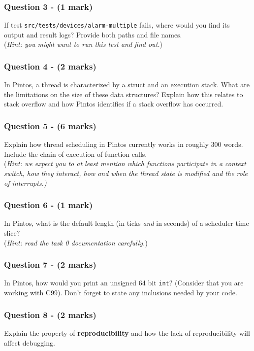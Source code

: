 \documentclass[a4paper,12pt]{article}
\begin{document}
\subsubsection*{Question 3 - (1 mark)}
If test \texttt{src/tests/devices/alarm-multiple} fails, where would you find its output and result logs? 
Provide both paths and file names.\\
(\textit{Hint: you might want to run this test and find out.}) 

\subsubsection*{Question 4 - (2 marks)}
In Pintos, a thread is characterized by a struct and an execution stack. 
What are the limitations on the size of these data structures? 
Explain how this relates to stack overflow and how Pintos identifies if a stack overflow has occurred.

\subsubsection*{Question 5 - (6 marks)}
Explain how thread scheduling in Pintos currently works in roughly 300 words. 
Include the chain of execution of function calls. \\
(\textit{Hint: we expect you to at least mention which functions participate in a context switch, how they interact, how and when the thread state is modified and the role of interrupts.)}

\subsubsection*{Question 6 - (1 mark)}
In Pintos, what is the default length (in ticks \emph{and} in seconds) of a scheduler time slice? \\
(\textit{Hint: read the task 0 documentation carefully.})

\subsubsection*{Question 7 - (2 marks)}
In Pintos, how would you print an unsigned 64 bit \texttt{int}? 
(Consider that you are working with C99). 
Don't forget to state any inclusions needed by your code.

\subsubsection*{Question 8 - (2 marks)}
Explain the property of {\bf reproducibility} and how the lack of reproducibility will affect debugging.
\end{document}
